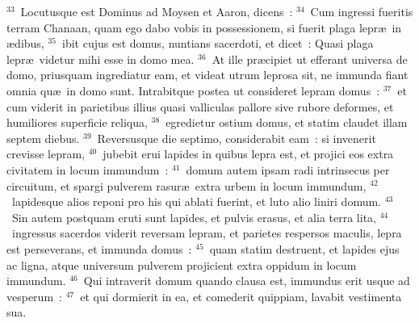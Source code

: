 ${}^{33}$~Locutusque est Dominus ad Moysen et Aaron, dicens~:
${}^{34}$~Cum ingressi fueritis terram Chanaan, quam ego dabo vobis in possessionem, si fuerit plaga lepr\ae\ in \ae dibus,
${}^{35}$~ibit cujus est domus, nuntians sacerdoti, et dicet~: Quasi plaga lepr\ae\ videtur mihi esse in domo mea.
${}^{36}$~At ille pr\ae cipiet ut efferant universa de domo, priusquam ingrediatur eam, et videat utrum leprosa sit, ne immunda fiant omnia qu\ae\ in domo sunt. Intrabitque postea ut consideret lepram domus~:
${}^{37}$~et cum viderit in parietibus illius quasi valliculas pallore sive rubore deformes, et humiliores superficie reliqua,
${}^{38}$~egredietur ostium domus, et statim claudet illam septem diebus.
${}^{39}$~Reversusque die septimo, considerabit eam~: si invenerit crevisse lepram,
${}^{40}$~jubebit erui lapides in quibus lepra est, et projici eos extra civitatem in locum immundum~:
${}^{41}$~domum autem ipsam radi intrinsecus per circuitum, et spargi pulverem rasur\ae\ extra urbem in locum immundum,
${}^{42}$~lapidesque alios reponi pro his qui ablati fuerint, et luto alio liniri domum.
${}^{43}$~Sin autem postquam eruti sunt lapides, et pulvis erasus, et alia terra lita,
${}^{44}$~ingressus sacerdos viderit reversam lepram, et parietes respersos maculis, lepra est perseverans, et immunda domus~:
${}^{45}$~quam statim destruent, et lapides ejus ac ligna, atque universum pulverem projicient extra oppidum in locum immundum.
${}^{46}$~Qui intraverit domum quando clausa est, immundus erit usque ad vesperum~:
${}^{47}$~et qui dormierit in ea, et comederit quippiam, lavabit vestimenta sua.


